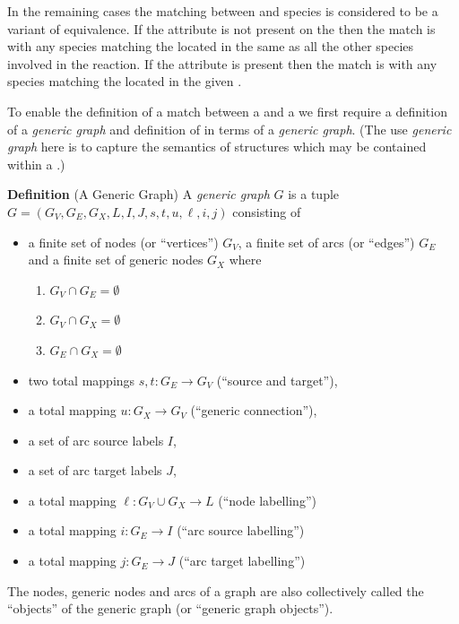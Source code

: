 \documentclass{cekarticle}
\begin{document}
In the remaining cases the matching between  and species
is considered to be a variant of  equivalence.  If the 
attribute is not present on the  then the match is with any
species matching the  located in the same  as all the other
species involved in the reaction.  If the  attribute is present then
the match is with any species matching the  located in the given .

To enable the definition of a match between a  and a 
we first require a definition of a \emph{generic graph} and definition of 
in terms of a \emph{generic graph}.  (The use \emph{generic graph} here is to capture the semantics of 
 structures which may be contained within a .)

\textbf{Definition} (A Generic Graph) A \emph{generic graph} $G$ is a tuple
$G = (G_{V}, G_{E}, G_{X}, L, I, J, s, t, u, \ell, i, j)$
consisting of
\begin{itemize}

\item a finite set of nodes (or ``vertices'') $G_{V}$, a finite set of arcs (or ``edges'') $G_{E}$
and a finite set of generic nodes $G_{X}$ where
    \begin{enumerate}
    \item $G_{V} \cap G_{E} = \emptyset$
    \item $G_{V} \cap G_{X} = \emptyset$
    \item $G_{E} \cap G_{X} = \emptyset$
    \end{enumerate}
    
\item two total mappings $s, t : G_{E} \rightarrow G_{V}$ (``source and target''),

\item a total mapping $u : G_{X} \rightarrow G_{V}$ (``generic connection''),

\item a set of arc source labels $I$,

\item a set of arc target labels $J$,

\item a total mapping $\ell : G_{V} \cup G_{X} \rightarrow L$ (``node labelling'')

\item a total mapping $i : G_{E} \rightarrow I$ (``arc source labelling'')

\item a total mapping $j : G_{E} \rightarrow J$ (``arc target labelling'')

\end{itemize}
The nodes, generic nodes and arcs of a graph are also collectively called the ``objects'' of the
generic graph (or ``generic graph objects'').
\end{document}
